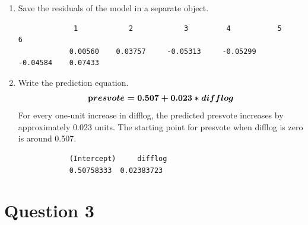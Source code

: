 \documentclass[12pt,letterpaper]{article}
\begin{document}
\begin{enumerate}
		
		
		\item Save the residuals of the model in a separate object.
			\vspace{.25cm}
			 
			\begin{verbatim}
		  	 1            2            3         4           5            6 
			0.00560    0.03757     -0.05313     -0.05299    -0.04584    0.07433 
			\end{verbatim}
			\vspace{.5cm}
		
		
		\item Write the prediction equation.
			\vspace{.25cm}
			\[
			\boldmath
			\textbf
			presvote = 0.507 + 0.023 * difflog
			\]
			For every one-unit increase in difflog, the predicted presvote increases by approximately 0.023 units. The starting point for presvote when difflog is zero is around 0.507.
			\vspace{.25cm}
			 
			\begin{verbatim}
			(Intercept)     difflog 
			0.50758333  0.02383723 
			\end{verbatim}			
		


	\end{enumerate}
	
	\newpage	
	
	

	
	
\section*{Question 3}
\end{document}
